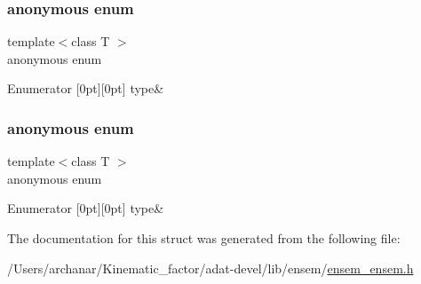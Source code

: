 \subsubsection{\texorpdfstring{anonymous enum}{anonymous enum}}
{\footnotesize\ttfamily template$<$class T $>$ \\
anonymous enum}

\begin{DoxyEnumFields}{Enumerator}
[0pt][0pt]{}\mbox{\label{structENSEM_1_1EnsbcIO_3_01Ensem_3_01T_01_4_01_4_a96e5c0cdf35d9f2fb39b4c54522912a7a69aac019e5c8434d1fa6bc1587dfec89}} 
type&\\
\hline

\end{DoxyEnumFields}
\mbox{\label{structENSEM_1_1EnsbcIO_3_01Ensem_3_01T_01_4_01_4_a96e5c0cdf35d9f2fb39b4c54522912a7}} 
\subsubsection{\texorpdfstring{anonymous enum}{anonymous enum}}
{\footnotesize\ttfamily template$<$class T $>$ \\
anonymous enum}

\begin{DoxyEnumFields}{Enumerator}
[0pt][0pt]{}\mbox{\label{structENSEM_1_1EnsbcIO_3_01Ensem_3_01T_01_4_01_4_a96e5c0cdf35d9f2fb39b4c54522912a7a69aac019e5c8434d1fa6bc1587dfec89}} 
type&\\
\hline

\end{DoxyEnumFields}


The documentation for this struct was generated from the following file\+:\begin{DoxyCompactItemize}
\item 
/\+Users/archanar/\+Kinematic\+\_\+factor/adat-\/devel/lib/ensem/\mbox{\hyperlink{adat-devel_2lib_2ensem_2ensem__ensem_8h}{ensem\+\_\+ensem.\+h}}\end{DoxyCompactItemize}
